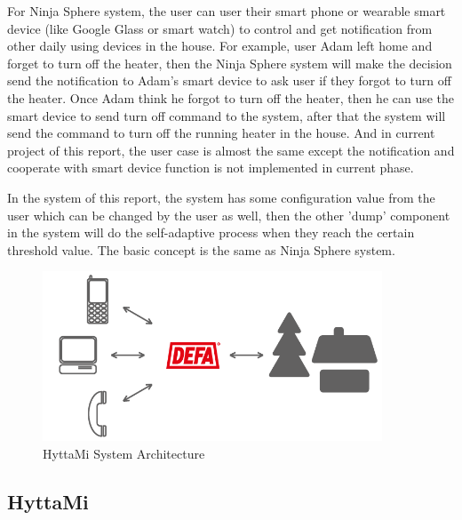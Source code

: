 \par For Ninja Sphere system, the user can user their smart phone or wearable smart device (like Google Glass or smart watch) to control and get notification from other daily using devices in the house. For example, user Adam left home and forget to turn off the heater, then the Ninja Sphere system will make the decision send the notification to Adam's smart device to ask user if they forgot to turn off the heater. Once Adam think he forgot to turn off the heater, then he can use the smart device to send turn off command to the system, after that the system will send the command to turn off the running heater in the house. And in current project of this report, the user case is almost the same except the notification and cooperate with smart device function is not implemented in current phase.
\par In the system of this report, the system has some configuration value from the user which can be changed by the user as well, then the other 'dump' component in the system will do the self-adaptive process when they reach the certain threshold value. The basic concept is the same as Ninja Sphere system.
\begin{figure}
	\centering    	
\includegraphics[width=0.90\textwidth,natwidth=610,natheight=642]{figs/hyttami_system.png}
  	\caption{HyttaMi System Architecture}
  	\label{fig:hyttami_system}
\end{figure}

\subsection{HyttaMi}

